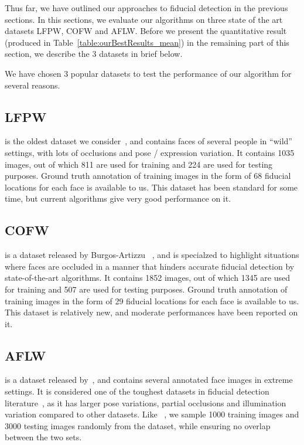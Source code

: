 Thus far, we have outlined our approaches to fiducial detection in the previous sections.
In this sections, we evaluate our algorithms on three state of the art datasets
LFPW, COFW and AFLW. Before we present the quantitative result (produced in Table~\ref{table:ourBestResults_mean}) in the remaining
part of this section, we describe the 3 datasets in brief below. 
 
 

We have chosen 3 popular datasets to test the performance of our algorithm for several reasons.

\subsection{LFPW}
is the oldest dataset we consider~\cite{kumarPAMI13_faceExem}, and contains faces of several people in ``wild'' settings,
with lots of occlusions and pose / expression variation. It contains 1035 images, out of which
811 are used for training and 224 are used for testing purposes. Ground truth annotation of
training images in the form of 68 fiducial locations for each face is available to us. This dataset
has been standard for some time, but current algorithms give very good performance 
on it.

\subsection{COFW}
is a dataset released by Burgos-Artizzu \etal~\cite{artizzzuICCV13_COFW}, and is
specialzed to highlight situations where faces are occluded in a manner
that hinders accurate fiducial detection by state-of-the-art algorithms.
It contains 1852 images, out of which
1345 are used for training and 507 are used for testing purposes. Ground truth annotation of
training images in the form of 29 fiducial locations for each face is available to us. This dataset
is relatively new, and moderate performances have been reported on it.

\subsection{AFLW}
is a dataset released by~\cite{koetsingerBFIAT11_AFLW}, and contains several annotated face images
in extreme settings. It is considered one of the toughest datasets in fiducial detection
literature~\cite{smithECCV14_ED,zhangECCV14_deepfacealign}, as it has larger pose variations, 
partial occlusions and illumination variation compared to other datasets. Like
~\cite{zhangECCV14_deepfacealign}, we sample 1000 training images and 3000 testing images
randomly from the dataset, while ensuring no overlap between the two sets.

